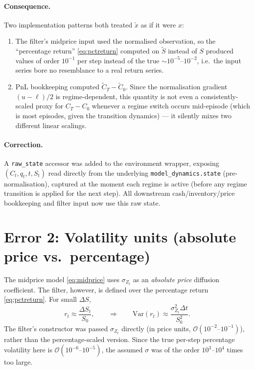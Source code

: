 \documentclass[11pt]{article}
\newcommand{\Var}{\mathrm{Var}}
\begin{document}
\paragraph{Consequence.} Two implementation patterns both treated $\tilde x$ as if it were $x$:
\begin{enumerate}
\item The filter's midprice input used the normalised observation, so the ``percentage return'' \eqref{eq:pctreturn} computed on $\tilde S$ instead of $S$ produced values of order $10^{-1}$ per step instead of the true $\sim 10^{-5}$--$10^{-2}$, i.e.\ the input series bore no resemblance to a real return series.
\item PnL bookkeeping computed $\tilde C_T - \tilde C_0$. Since the normalisation gradient $(u-\ell)/2$ is regime-dependent, this quantity is not even a consistently-scaled proxy for $C_T - C_0$ whenever a regime switch occurs mid-episode (which is most episodes, given the transition dynamics) — it silently mixes two different linear scalings.
\end{enumerate}

\paragraph{Correction.} A \texttt{raw\_state} accessor was added to the environment wrapper, exposing $(C_t, q_t, t, S_t)$ read directly from the underlying \texttt{model\_dynamics.state} (pre-normalisation), captured at the moment each regime is active (before any regime transition is applied for the next step). All downstream cash/inventory/price bookkeeping and filter input now use this raw state.

\section{Error 2: Volatility units (absolute price vs.\ percentage)}
\label{sec:pctunits}

The midprice model \eqref{eq:midprice} uses $\sigma_{Z_t}$ as an \emph{absolute price} diffusion coefficient. The filter, however, is defined over the percentage return \eqref{eq:pctreturn}. For small $\Delta S$,
\begin{equation}
r_t \approx \frac{\Delta S_t}{S_0}, \qquad \Rightarrow \qquad \Var(r_t) \approx \frac{\sigma_{Z_t}^2 \Delta t}{S_0^2}.
\end{equation}
The filter's constructor was passed $\sigma_{Z_t}$ directly (in price units, $\mathcal O(10^{-2}\text{--}10^{-1})$), rather than the percentage-scaled version. Since the true per-step percentage volatility here is $\mathcal O(10^{-6}\text{--}10^{-5})$, the assumed $\sigma$ was of the order $10^3$--$10^4$ times too large.
\end{document}
